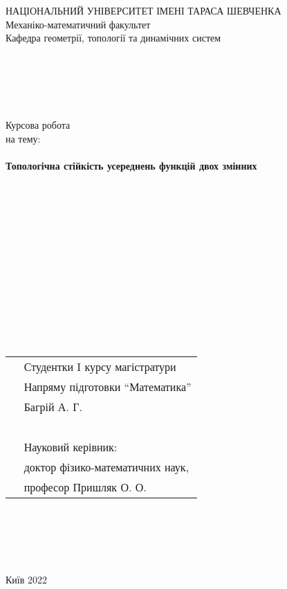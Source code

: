 \documentclass[12pt]{article}
\begin{document}
	\begin{titlepage}
		\begin{center}
			{ НАЦІОНАЛЬНИЙ УНІВЕРСИТЕТ ІМЕНІ ТАРАСА ШЕВЧЕНКА}\\
			{\Large Механіко-математичний факультет \\
				Кафедра геометрії, топології та динамічних систем}
		\end{center}
		\leavevmode \\
		\leavevmode \\
		\leavevmode \\
		\leavevmode \\
		\begin{center}
			{\LARGE  Курсова робота\\}
			на тему: \\
			\leavevmode \\
			{\Huge \textbf{Топологічна стійкість усереднень функцій двох змінних}}			
		\end{center}
		\leavevmode \\
		\leavevmode \\
		\leavevmode \\
		\leavevmode \\	
		\leavevmode \\
		\leavevmode \\
		\leavevmode \\
		\leavevmode \\	
		\leavevmode \\
		\leavevmode \\
		\leavevmode \\
		\leavevmode \\     
		\begin{tabular}{p{7cm}p{12cm}}
			\, & {\large Студентки I курсу магістратури} \\
			\, & {\large Напряму підготовки ``Математика''} \\
			\, & {\large Багрій А. Г.} \\
			\, & \, \\
			\, & {\large Науковий керівник:} \\
			\, & {\large доктор фізико-математичних наук, } \\
			\, & {\large професор Пришляк О. О.} \\
		\end{tabular}
		\leavevmode \\
		\leavevmode \\
		\leavevmode \\
		\leavevmode \\
		\vfill
		\begin{center}
			{\Large Київ 2022}
		\end{center}
	\end{titlepage}
	
\end{document}

